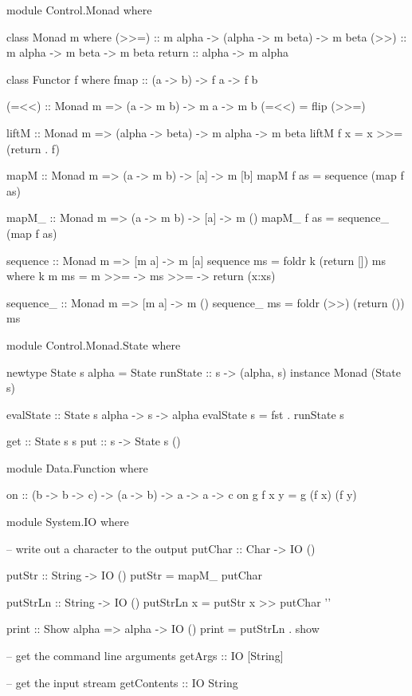 \begin{code}
module Control.Monad where

class Monad m where
		(>>=) :: m alpha -> (alpha -> m beta) -> m beta
		(>>) :: m alpha -> m beta -> m beta
		return :: alpha -> m alpha

class Functor f where
	  fmap :: (a -> b) -> f a -> f b

(=<<) :: Monad m => (a -> m b) -> m a -> m b
(=<<) = flip (>>=)

liftM :: Monad m => (alpha -> beta) -> m alpha -> m beta
liftM f x = x >>= (return . f)

mapM            :: Monad m => (a -> m b) -> [a] -> m [b]
mapM f as       =  sequence (map f as)

mapM_           :: Monad m => (a -> m b) -> [a] -> m ()
mapM_ f as      =  sequence_ (map f as)

sequence       :: Monad m => [m a] -> m [a] 
sequence ms = foldr k (return []) ms
	where k m ms = m >>= \x -> ms >>= \xs -> return (x:xs)

sequence_        :: Monad m => [m a] -> m () 
sequence_ ms     =  foldr (>>) (return ()) ms
\end{code}

\begin{code}
module Control.Monad.State where

newtype State s alpha = State {runState :: s -> (alpha, s)}
instance Monad (State s)

evalState :: State s alpha -> s -> alpha
evalState s = fst . runState s

get :: State s s
put :: s -> State s ()
\end{code}

\begin{code}
module Data.Function where

on :: (b -> b -> c) -> (a -> b) -> a -> a -> c
on g f x y = g (f x) (f y)
\end{code}

\begin{code}
module System.IO where

-- write out a character to the output
putChar :: Char -> IO ()

putStr :: String -> IO ()
putStr = mapM_ putChar

putStrLn :: String -> IO ()
putStrLn x = putStr x >> putChar '\n'

print :: Show alpha => alpha -> IO ()
print = putStrLn . show

-- get the command line arguments
getArgs :: IO [String]

-- get the input stream
getContents :: IO String
\end{code}

